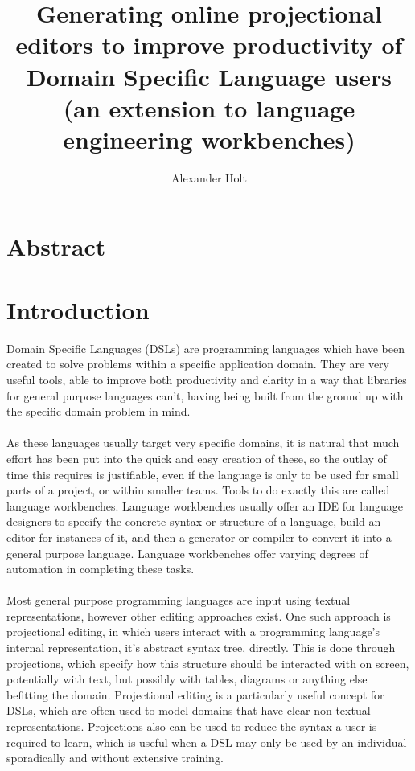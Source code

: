 \documentclass{article}
\begin{document}
\newcommand{\RSetup}[0]{R1\xspace}
\newcommand{\RCustom}[0]{R2\xspace}
\newcommand{\RLightweight}[0]{R3\xspace}
\newcommand{\RIntuitive}[0]{R4\xspace}
\newcommand{\RFamiliarity}{R5\xspace}

\title{Generating online projectional editors to improve productivity of
Domain Specific Language users (an extension to language engineering
workbenches)}
\author{Alexander Holt}
\maketitle

%
\section*{Abstract}
\clearpage
\tableofcontents
\clearpage

\section{Introduction}

Domain Specific Languages (DSLs) are programming languages which have been created to solve problems within a specific application domain. They are very useful tools, able to improve both productivity and clarity in a way that libraries for general purpose languages can't, having being built from the ground up with the specific domain problem in mind. 
\\
\\
As these languages usually target very specific domains, it is natural that much effort has been put into the quick and easy creation of these, so the outlay of time this requires is justifiable, even if the language is only to be used for small parts of a project, or within smaller teams. Tools to do exactly this are called language workbenches. Language workbenches usually offer an IDE for language designers to specify the concrete syntax or structure of a language, build an editor for instances of it, and then a generator or compiler to convert it into a general purpose language. Language workbenches offer varying degrees of automation in completing these tasks.
\\
\\
Most general purpose programming languages are input using textual representations, however other editing approaches exist. One such approach is projectional editing, in which users interact with a programming language's internal representation, it's abstract syntax tree, directly. This is done through projections, which specify how this structure should be interacted with on screen, potentially with text, but possibly with tables, diagrams or anything else befitting the domain. Projectional editing is a particularly useful concept for DSLs, which are often used to model domains that have clear non-textual representations. Projections also can be used to reduce the syntax a user is required to learn, which is useful when a DSL may only be used by an individual sporadically and without extensive training.
\end{document}
